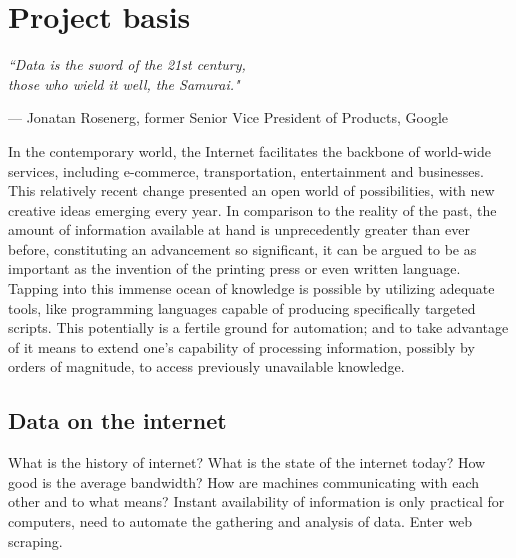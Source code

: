 \chapter{Project basis}
\label{ch:basis}
\setlength{\epigraphwidth}{8.8cm}
\epigraph{\textit{``Data is the sword of the 21st century, \\\hspace{2.4cm}those who wield it well, the Samurai."}}{--- Jonatan Rosenerg, former Senior Vice President of Products, Google}

In the contemporary world, the Internet facilitates the backbone of world-wide services, including e-commerce, transportation, entertainment and businesses. This relatively recent change presented an open world of possibilities, with new creative ideas emerging every year. In comparison to the reality of the past, the amount of information available at hand is unprecedently greater than ever before, constituting an advancement so significant, it can be argued to be as important as the invention of the printing press or even written language. Tapping into this immense ocean of knowledge is possible by utilizing adequate tools, like programming languages capable of producing specifically targeted scripts. This potentially is a fertile ground for automation; and to take advantage of it means to extend one's capability of processing information, possibly by orders of magnitude, to access previously unavailable knowledge.


\section{Data on the internet}
What is the history of internet?
What is the state of the internet today?
How good is the average bandwidth?
How are machines communicating with each other and to what means?
Instant availability of information is only practical for computers, need to automate the gathering and analysis of data. Enter web scraping.


